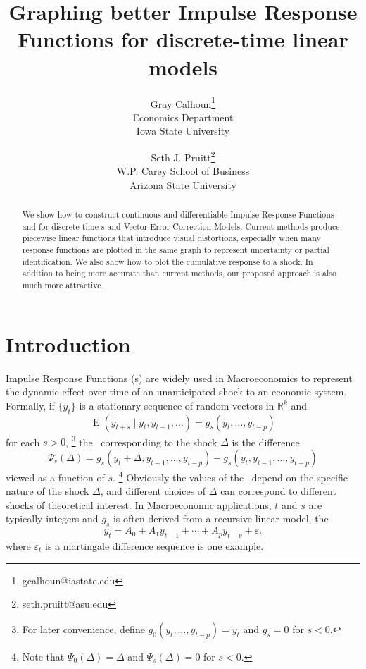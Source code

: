 \documentclass[12pt,fleqn]{article}
\author{Gray Calhoun\thanks{gcalhoun@iastate.edu}
  \\ Economics Department \\ Iowa State University
  \and Seth J. Pruitt\thanks{seth.pruitt@asu.edu}
  \\ W.P. Carey School of Business \\ Arizona State University}
\title{Graphing better Impulse Response Functions for discrete-time
  linear models}
\DeclareMathOperator{\E}{E}
\newcommand{\vep}{\varepsilon}
\newcommand{\RR}{\mathbb{R}}
\begin{document}
\maketitle
\begin{abstract}\noindent%
  We show how to construct continuous and differentiable
  Impulse Response Functions and for discrete-time \VAR s and Vector
  Error-Correction Models. Current methods produce piecewise linear
  functions that introduce visual distortions, especially when many
  response functions are plotted in the same graph to represent
  uncertainty or partial identification. We also show how to plot the
  cumulative response to a shock. In addition to being more accurate
  than current methods, our proposed approach is also much more attractive.
\end{abstract}

\section{Introduction}

Impulse Response Functions (\IRF s) are widely used in Macroeconomics
to represent the dynamic effect over time of an unanticipated shock to
an economic system. Formally, if $\{y_t\}$ is a stationary sequence of
random vectors in $\RR^k$ and
\[
\E(y_{t+s} \mid y_t, y_{t-1},\dots) = g_s(y_t,\dots,y_{t-p})
\]
for each $s > 0$,%
\footnote{For later convenience, define
  $g_0(y_t,\dots,y_{t-p}) = y_t$ and $g_s = 0$ for $s < 0$.} %
the \IRF\ corresponding to the shock $\Delta$ is the difference
\[
\Psi_s(\Delta) = g_s(y_t + \Delta, y_{t-1},\dots,y_{t-p}) - g_s(y_t, y_{t-1},\dots,y_{t-p})
\]
viewed as a function of $s$.%
\footnote{Note that $\Psi_0(\Delta) = \Delta$ and $\Psi_s(\Delta) = 0$ for $s <
  0$.} %
Obviously the values of the \IRF\ depend on the specific nature of the
shock $\Delta$, and different choices of $\Delta$ can correspond to
different shocks of theoretical interest.  In Macroeconomic
applications, $t$ and $s$ are typically integers and $g_s$ is often
derived from a recursive linear model, the \VAR
\begin{equation}\label{eq:1}
  y_t = A_0 + A_1 y_{t-1} + \cdots + A_p y_{t-p} + \vep_t
\end{equation}
where $\vep_t$ is a martingale difference sequence is one example.
\end{document}
